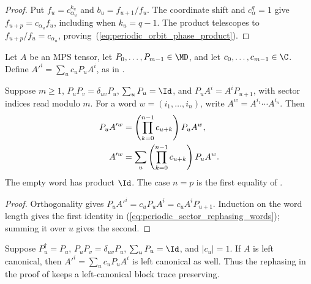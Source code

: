 \begin{proof}\leanok
    Put $f_u=c_{\alpha_u}^{k_u}$ and $b_u=f_{u+1}/f_u$.
    The coordinate shift and $c_\alpha^q=1$ give
    $f_{u+p}=c_{\alpha_u}f_u$, including when $k_u=q-1$.
    The product telescopes to $f_{u+p}/f_u=c_{\alpha_u}$,
    proving~(\ref{eq:periodic_orbit_phase_product}).
\end{proof}

\begin{definition}
    \label{def:periodic_sector_rephasing}
    \leanok
    Let $A$ be an MPS tensor, let $P_0,\ldots,P_{m-1}\in\MD$, and let
    $c_0,\ldots,c_{m-1}\in\C$. Define $A'^i=\sum_u c_u P_u A^i$, as in
    \cite[before eq.~\emph{Aprime-is-cPA}]{DeLasCuevas2017Irreducible}.
\end{definition}

\begin{lemma}
    \label{thm:periodic_sector_rephasing_words}
    \leanok
    Suppose $m\geq1$, $P_uP_v=\delta_{uv}P_u$, $\sum_u P_u=\Id$, and
    $P_uA^i=A^iP_{u+1}$, with sector indices read modulo $m$.
    For a word $w=(i_1,\ldots,i_n)$, write $A^w=A^{i_1}\cdots A^{i_n}$.
    Then
    \begin{align}
        P_u A'^w & = \left(\prod_{k=0}^{n-1}c_{u+k}\right)P_u A^w, \notag \\
        A'^w     & = \sum_u\left(\prod_{k=0}^{n-1}c_{u+k}\right)P_u A^w.
        \label{eq:periodic_sector_rephasing_words}
    \end{align}
    The empty word has product $\Id$. The case $n=p$ is the first equality of
    \cite[eq.~\emph{Aprime-is-cPA}]{DeLasCuevas2017Irreducible}.
\end{lemma}

\begin{proof}\leanok
    Orthogonality gives $P_u A'^i=c_uP_u A^i=c_uA^iP_{u+1}$.
    Induction on the word length gives the first identity in
    (\ref{eq:periodic_sector_rephasing_words}); summing it over $u$ gives the second.
\end{proof}

\begin{lemma}
    \label{thm:periodic_sector_rephasing_left_canonical}
    \leanok
    Suppose $P_u^\dagger=P_u$, $P_uP_v=\delta_{uv}P_u$,
    $\sum_uP_u=\Id$, and $|c_u|=1$. If $A$ is left canonical, then
    $A'^i=\sum_uc_uP_uA^i$ is left canonical as well. Thus the rephasing
    in the proof of \cite[Theorem~4.1]{DeLasCuevas2017Irreducible}
    keeps a left-canonical block trace preserving.
\end{lemma}

